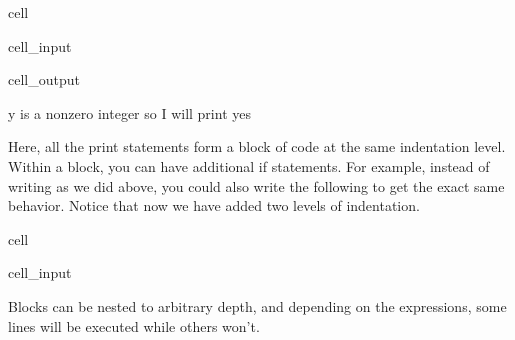 \documentclass[letterpaper,10pt,english]{jupyterBook}
\begin{document}
\begin{sphinxuseclass}{cell}\begin{sphinxVerbatimInput}

\begin{sphinxuseclass}{cell_input}
\begin{sphinxVerbatim}[commandchars=\\\{\}]
  
\end{sphinxVerbatim}

\end{sphinxuseclass}\end{sphinxVerbatimInput}
\begin{sphinxVerbatimOutput}

\begin{sphinxuseclass}{cell_output}
\begin{sphinxVerbatim}[commandchars=\\\{\}]
y
is a non\PYGZhy{}zero integer
so I will print
yes
\end{sphinxVerbatim}

\end{sphinxuseclass}\end{sphinxVerbatimOutput}

\end{sphinxuseclass}
\sphinxAtStartPar
Here, all the print statements form a block of code at the same indentation level. Within a block, you can have additional if statements. For example, instead of writing  as we did above, you could also write the following to get the exact same behavior. Notice that now we have added two levels of indentation.

\begin{sphinxuseclass}{cell}\begin{sphinxVerbatimInput}

\begin{sphinxuseclass}{cell_input}
\begin{sphinxVerbatim}[commandchars=\\\{\}]
 
     
\end{sphinxVerbatim}

\end{sphinxuseclass}\end{sphinxVerbatimInput}

\end{sphinxuseclass}
\sphinxAtStartPar
Blocks can be nested to arbitrary depth, and depending on the expressions, some lines will be executed while others won’t.
\end{document}
